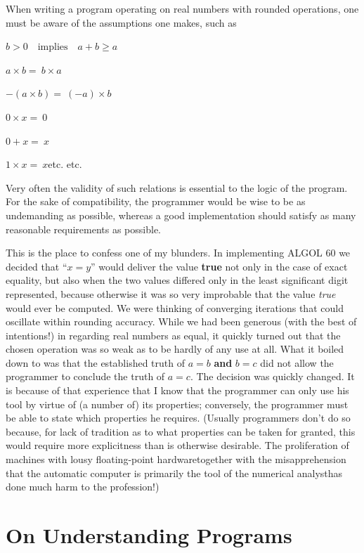\documentclass[twoside,11pt]{book}
\begin{document}
When writing a program operating on real numbers with rounded operations, one must be aware of the assumptions one makes, such as
\smallskip

\tabto*{10em}$b > 0\quad \text{implies}\quad a + b \geqslant a$

\tabto*{10em}$a\times b =\ b\times a$

\tabto*{10em}$-(a \times  b) =\ (-a)\times b$

\tabto*{10em}$0\times  x =\ 0$

\tabto*{10em}$0 + x =\ x$

\tabto*{10em}$1\times x =\ x$\quad etc. etc.
\smallskip
 
Very often the validity of such relations is essential to the logic of the program. For the sake of compatibility, the programmer would be wise to be as undemanding as possible, whereas a good implementation should satisfy as many reasonable requirements as possible.

This is the place to confess one of my blunders. In implementing ALGOL 60 we decided that ``$x = y$'' would deliver the value \textbf{true} not only in the case of exact equality, but also when the two values differed only in the least significant digit represented, because otherwise it was so very improbable that the value \textit{true} would ever be computed. We were thinking of converging iterations that could oscillate within rounding accuracy. While we had been generous (with the best of intentions!) in regarding real numbers as equal, it quickly turned out that the chosen operation was so weak as to be hardly of any use at all. What it boiled down to was that the established truth of $a = b$ \textbf{and} $b = c$ did not allow the programmer to conclude the truth of $a = c$. The decision was quickly changed. It is because of that experience that I know that the programmer can only use his tool by virtue of (a number of) its properties; conversely, the programmer must be able to state which properties he requires. (Usually programmers don't do so because, for lack of tradition as to what properties can be taken for granted, this would require more explicitness than is otherwise desirable. The proliferation of machines with lousy floating-point hardware\textemdash{}together with the misapprehension that the automatic computer is primarily the tool of the numerical analyst\textemdash{}has done much harm to the profession!)

\section[On understanding programs]{On Understanding Programs}
\label{sec:undertanding-programs}
\end{document}
